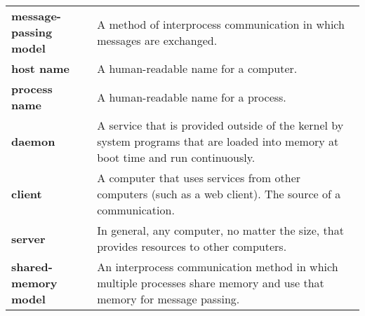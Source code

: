 \begin{tabular}{>{\raggedright}p{} >{\raggedright\arraybackslash}p{}}
\textbf{message-passing model} & A method of interprocess communication in which messages are exchanged. \\
\textbf{host name} & A human-readable name for a computer. \\
\textbf{process name} & A human-readable name for a process. \\
\textbf{daemon} & A service that is provided outside of the kernel by system programs that are loaded into memory at boot time and run continuously. \\
\textbf{client} & A computer that uses services from other computers (such as a web client). The source of a communication. \\
\textbf{server} & In general, any computer, no matter the size, that provides resources to other computers.\\
\textbf{shared-memory model} & An interprocess communication method in which multiple processes share memory and use that memory for message passing. \\
\bottomrule
\end{tabular}
\vspace{\baselineskip}

